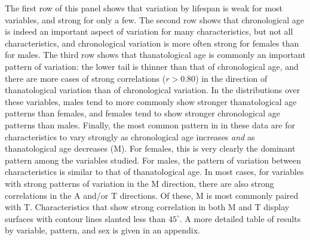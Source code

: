 \documentclass[11pt,oneside]{article} %
\begin{document}
The first row of this panel shows that variation by lifespan is weak for most
variables, and strong for only a few. The second row shows that chronological
age is indeed an important aspect of variation for many characteristics, but not
all characteristics, and chronological variation is more often strong for
females than for males.
The third row shows that thanatological age is commonly an important pattern of variation: the lower tail
is thinner than that of chronological age, and there are more cases of
strong correlations ($r>0.80$) in the direction of thanatological variation than
of chronological variation. In the distributions over these variables, males tend to
more commonly show stronger thanatological age patterns than females, and
females tend to show stronger chronological age patterns than males. Finally, the most common pattern in in these data are for
characteristics to vary strongly as chronological age increases \textit{and} as
thanatological age decreases (M). For females, this is very clearly the dominant
pattern among the variables studied. For males, the pattern of variation between
characteristics is similar to that of thanatological age. In most cases, for
variables with strong patterns of variation in the M direction, there are also
strong correlations in the A and/or T directions. Of these, M is most commonly
paired with T. Characteristics that show strong correlation in both M and T
display surfaces with contour lines slanted less than $45^\circ$. A more
detailed table of results by variable, pattern, and sex is given in an appendix.
\end{document}
